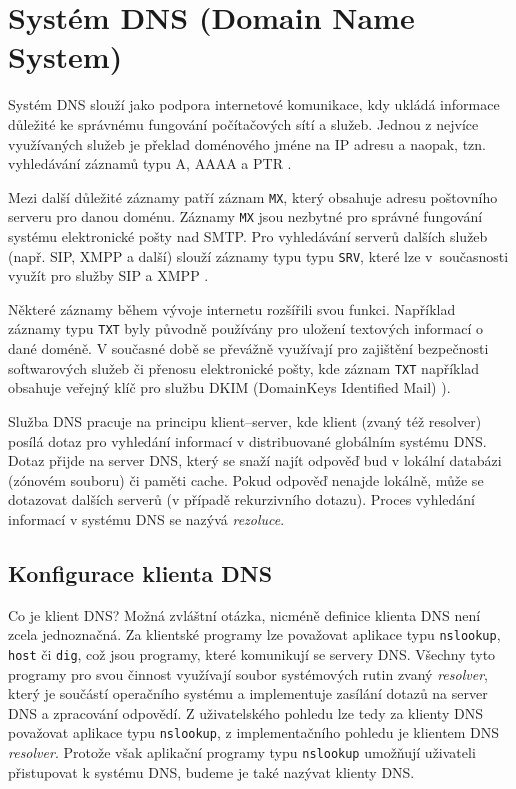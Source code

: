 \section{Systém DNS (Domain Name System)}\label{dns}
Systém DNS slouží jako podpora internetové komunikace, kdy ukládá informace důležité ke správnému fungování počítačových sítí a služeb. Jednou z nejvíce využívaných služeb je překlad doménového jméne na IP adresu a naopak, tzn. vyhledávání záznamů typu A, AAAA a PTR \cite{rfc1035,rfc3596}.

Mezi další důležité záznamy patří záznam {\tt MX}, který obsahuje adresu poštovního serveru pro danou doménu. Záznamy {\tt MX} jsou nezbytné pro správné fungování systému elektronické pošty nad SMTP. Pro vyhledávání serverů dalších služeb (např. SIP, XMPP a další) slouží záznamy typu typu {\tt SRV}, které lze v~současnosti využít pro služby SIP a XMPP \cite{rfc2782}.

Některé záznamy během vývoje internetu rozšířili svou funkci. Například záznamy typu {\tt TXT} byly původně používány pro uložení textových informací o dané doméně. V současné době se převážně využívají pro zajištění bezpečnosti softwarových služeb či přenosu elektronické pošty, kde záznam {\tt TXT} například obsahuje veřejný klíč pro službu DKIM (DomainKeys Identified Mail) \cite{rfc6376}).

Služba DNS pracuje na principu klient--server, kde klient (zvaný též resolver) posílá dotaz pro vyhledání informací v distribuované globálním systému DNS. Dotaz přijde na server DNS, který se snaží najít odpověď bud v lokální databázi (zónovém souboru) či paměti cache. Pokud odpověď nenajde lokálně, může se dotazovat dalších serverů (v případě rekurzivního dotazu). Proces vyhledání informací v systému DNS se nazývá {\em rezoluce}. 

\subsection{Konfigurace klienta DNS}
Co je klient DNS? Možná zvláštní otázka, nicméně definice klienta DNS není zcela jednoznačná. Za klientské programy lze považovat aplikace typu {\tt nslookup}, {\tt host} či {\tt dig}, což jsou programy, které komunikují se servery DNS. Všechny tyto programy pro svou činnost využívají soubor systémových rutin zvaný {\em resolver}, který je součástí operačního systému a implementuje zasílání dotazů na server DNS a zpracování odpovědí. Z uživatelského pohledu lze tedy za klienty DNS považovat aplikace typu {\tt nslookup}, z implementačního pohledu je klientem DNS {\em resolver}. Protože však aplikační programy typu {\tt nslookup} umožňují uživateli přistupovat k systému DNS, budeme je také nazývat klienty DNS.

